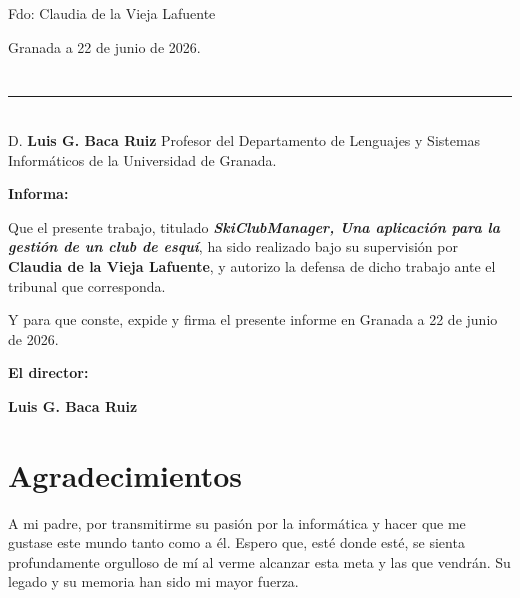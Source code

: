 \vspace{6cm}

\noindent Fdo: Claudia de la Vieja Lafuente

\vspace{2cm}

\begin{flushright}
Granada a 22 de junio de 2026.
\end{flushright}


\chapter*{}
\thispagestyle{empty}

\noindent\rule[-1ex]{\textwidth}{2pt}\\[4.5ex]

D. \textbf{Luis G. Baca Ruiz } Profesor del Departamento de Lenguajes y Sistemas Informáticos de la Universidad de Granada.

\vspace{0.5cm}

\textbf{Informa:}

\vspace{0.5cm}

Que el presente trabajo, titulado \textit{\textbf{SkiClubManager, Una aplicación para la gestión de un club de esquí}},
ha sido realizado bajo su supervisión por \textbf{Claudia de la Vieja Lafuente}, y autorizo la defensa de dicho trabajo ante el tribunal
que corresponda.

\vspace{0.5cm}

Y para que conste, expide y firma el presente informe en Granada a 22 de junio de 2026.

\vspace{1cm}

\textbf{El director:}

\vspace{5cm}

\noindent \textbf{Luis G. Baca Ruiz } 

\chapter*{Agradecimientos}
\thispagestyle{empty}

       \vspace{1cm}


A mi padre, por transmitirme su pasión por la informática y hacer que me gustase este mundo tanto como a él. Espero que, esté donde esté, se sienta profundamente orgulloso de mí al verme alcanzar esta meta y las que vendrán. Su legado y su memoria han sido mi mayor fuerza. \par \bigskip


